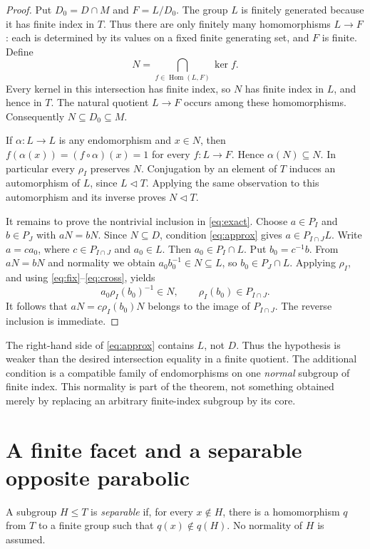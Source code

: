 \documentclass[11pt]{article}
\theoremstyle{remark}\newtheorem{remark}[theorem]{Remark}
\begin{document}
\begin{proof}
Put \(D_0=D\cap M\) and \(F=L/D_0\). The group \(L\) is finitely generated
because it has finite index in \(T\). Thus there are only finitely many
homomorphisms \(L\to F\): each is determined by its values on a fixed finite
generating set, and \(F\) is finite. Define
\[
 N=\bigcap_{f\in\operatorname{Hom}(L,F)}\ker f.
\]
Every kernel in this intersection has finite index, so \(N\) has finite
index in \(L\), and hence in \(T\). The natural quotient \(L\to F\) occurs
among these homomorphisms. Consequently \(N\subseteq D_0\subseteq M\).

If \(\alpha:L\to L\) is any endomorphism and \(x\in N\), then
\(f(\alpha(x))=(f\circ\alpha)(x)=1\) for every \(f:L\to F\). Hence
\(\alpha(N)\subseteq N\). In particular every \(\rho_I\) preserves \(N\).
Conjugation by an element of \(T\) induces an automorphism of \(L\), since
\(L\lhd T\). Applying the same observation to this automorphism and its
inverse proves \(N\lhd T\).

It remains to prove the nontrivial inclusion in \eqref{eq:exact}. Choose
\(a\in P_I\) and \(b\in P_J\) with \(aN=bN\). Since \(N\subseteq D\),
condition \eqref{eq:approx} gives \(a\in P_{I\cap J}L\). Write \(a=ca_0\),
where \(c\in P_{I\cap J}\) and \(a_0\in L\). Then \(a_0\in P_I\cap L\).
Put \(b_0=c^{-1}b\). From \(aN=bN\) and normality we obtain
\(a_0b_0^{-1}\in N\subseteq L\), so \(b_0\in P_J\cap L\). Applying
\(\rho_I\), and using \eqref{eq:fix}--\eqref{eq:cross}, yields
\[
 a_0\rho_I(b_0)^{-1}\in N,\qquad
 \rho_I(b_0)\in P_{I\cap J}.
\]
It follows that \(aN=c\rho_I(b_0)N\) belongs to the image of
\(P_{I\cap J}\). The reverse inclusion is immediate.
\end{proof}

The right-hand side of \eqref{eq:approx} contains \(L\), not \(D\).
Thus the hypothesis is weaker than the desired intersection equality in a
finite quotient. The additional condition is a compatible family of
endomorphisms on one \emph{normal} subgroup of finite index. This normality
is part of the theorem, not something obtained merely by replacing an
arbitrary finite-index subgroup by its core.

\section{A finite facet and a separable opposite parabolic}

A subgroup \(H\leq T\) is \emph{separable} if, for every \(x\notin H\),
there is a homomorphism \(q\) from \(T\) to a finite group such that
\(q(x)\notin q(H)\). No normality of \(H\) is assumed.
\end{document}

